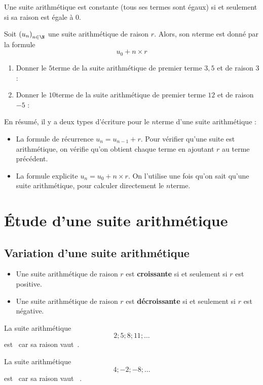 \documentclass{article}
\begin{document}
\begin{remark}
Une suite arithmétique est constante (tous ses termes sont égaux) si et seulement si sa raison est égale à $0$.
\end{remark}
\begin{proposition}
Soit $\left(u_n\right)_{n \in \N}$ une suite arithmétique de raison $r$. Alors, son $n$\ieme terme est donné par la formule
\begin{equation*}
u_0 + n \times r
\end{equation*}
\end{proposition}
\begin{example}
\hfill
\begin{enumerate}[label=\emph{\alph*)}]
\item Donner le $5$\ieme terme de la suite arithmétique de premier terme $3,5$ et de raison $3$ : \answersline
\item Donner le $10$\ieme terme de la suite arithmétique de premier terme $12$ et de raison $-5$ : \answersline 
\end{enumerate}
\end{example}
\begin{tcolorbox}
En résumé, il y a deux types d'écriture pour le $n$\ieme terme d'une suite arithmétique :
\begin{itemize}
\item La formule de récurrence $u_n = u_{n - 1} + r$. Pour vérifier qu'une suite est arithmétique, on vérifie qu'on obtient chaque terme en ajoutant $r$ au terme précédent.
\item La formule explicite $u_n = u_0 + n \times r$. On l'utilise une fois qu'on sait qu'une suite arithmétique, pour calculer directement le $n$\ieme terme.
\end{itemize} 
\end{tcolorbox}
\newpage
\section{Étude d'une suite arithmétique}
\subsection{Variation d'une suite arithmétique}
\begin{proposition}
\hfill
\begin{itemize}
\item Une suite arithmétique de raison $r$ est \textbf{croissante} si et seulement si $r$ est positive.
\item Une suite arithmétique de raison $r$ est \textbf{décroissante} si et seulement si $r$ est négative.
\end{itemize}
\end{proposition}
\begin{example}
La suite arithmétique
\begin{equation*}
2; 5; 8; 11; \dots 
\end{equation*}
est \answersline~car sa raison vaut~\answersline.

La suite arithmétique
\begin{equation*}
4; -2; -8; \dots 
\end{equation*}
est \answersline~car sa raison vaut~ \answersline.
\end{example}
\end{document}
